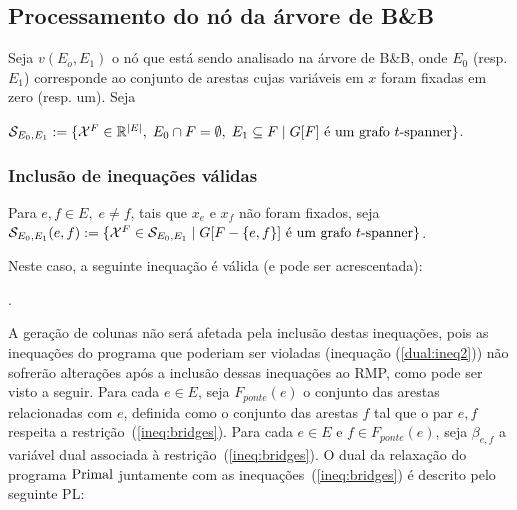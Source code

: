 \subsection{Processamento do nó da árvore de B\&B}
Seja $v(E_o, E_1)$ o nó que está sendo analisado na árvore de B\&B, onde $E_0$
(resp. $E_1$) corresponde ao conjunto de arestas cujas variáveis em $x$
foram fixadas em zero (resp. um). Seja

  \mbox{$\mathcal{S}_{E_0, E_1} := \{\mathcal{X}^{F} \in \mathbb{R}^{|E|},\; E_0 \cap F =
    \emptyset,\; E_1 \subseteq F\; |\; \text{$G[F]$ é um grafo
      $t$-spanner\}}$}.

\subsubsection{Inclusão de inequações válidas}

Para $e,f \in E,\; e \neq f$, tais que $x_e$ e $x_f$ não foram fixados, seja \\
  $\mathcal{S}_{E_0, E_1}(e,f) := \{\mathcal{X}^{F} \in
  \mathcal{S}_{E_0, E_1} \; |\; \text{$G[F-\{e,f\}]$ é um grafo
    $t$-spanner\}}$.

\noindent Neste caso, a seguinte inequação é válida (e pode ser acrescentada):
%  
\begin{lpformulation}[]
.
\end{lpformulation}

A geração de colunas não será afetada pela inclusão destas inequações,
pois as inequações do programa \FullDualPL\; que poderiam ser violadas
(inequação (\ref{dual:ineq2})) não sofrerão alterações após a inclusão
dessas inequações ao RMP, como pode ser visto a seguir.  Para cada
$e \in E$, seja $F_{ponte}(e)$ o conjunto das arestas relacionadas com
$e$, definida como o conjunto das arestas $f$ tal que o par $e,f$
respeita a restrição~(\ref{ineq:bridges}). Para cada $e \in E$ e
$f \in F_{ponte}(e)$, seja $\beta_{e,f}$ a variável dual associada à
restrição~(\ref{ineq:bridges}).  O dual da relaxação do programa
$\rm{Primal}$ juntamente com as inequações~(\ref{ineq:bridges}) é
descrito pelo seguinte PL:

\begin{lpformulation}[\FullDualTwoPL]
\end{lpformulation}


